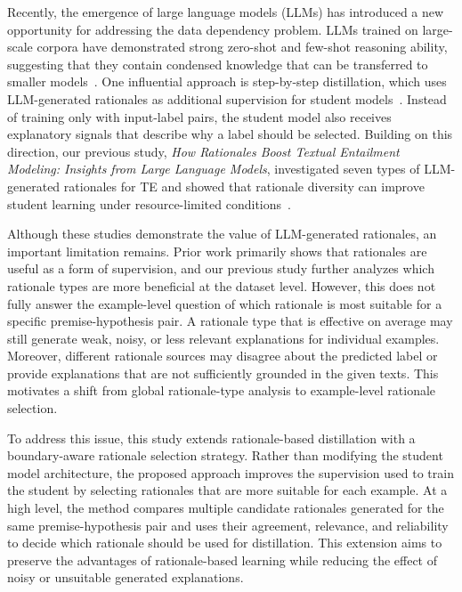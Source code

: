 \documentclass[11pt]{article}
\begin{document}
Recently, the emergence of large language models (LLMs) has introduced a new opportunity for addressing the data dependency problem. LLMs trained on large-scale corpora have demonstrated strong zero-shot and few-shot reasoning ability, suggesting that they contain condensed knowledge that can be transferred to smaller models~\cite{brown2020language,wei2022chain}. One influential approach is step-by-step distillation, which uses LLM-generated rationales as additional supervision for student models~\cite{hsieh2023distilling}. Instead of training only with input-label pairs, the student model also receives explanatory signals that describe why a label should be selected. Building on this direction, our previous study, \emph{How Rationales Boost Textual Entailment Modeling: Insights from Large Language Models}, investigated seven types of LLM-generated rationales for TE and showed that rationale diversity can improve student learning under resource-limited conditions~\cite{our_rationale_te_paper}.

Although these studies demonstrate the value of LLM-generated rationales, an important limitation remains. Prior work primarily shows that rationales are useful as a form of supervision, and our previous study further analyzes which rationale types are more beneficial at the dataset level. However, this does not fully answer the example-level question of which rationale is most suitable for a specific premise-hypothesis pair. A rationale type that is effective on average may still generate weak, noisy, or less relevant explanations for individual examples. Moreover, different rationale sources may disagree about the predicted label or provide explanations that are not sufficiently grounded in the given texts. This motivates a shift from global rationale-type analysis to example-level rationale selection.

To address this issue, this study extends rationale-based distillation with a boundary-aware rationale selection strategy. Rather than modifying the student model architecture, the proposed approach improves the supervision used to train the student by selecting rationales that are more suitable for each example. At a high level, the method compares multiple candidate rationales generated for the same premise-hypothesis pair and uses their agreement, relevance, and reliability to decide which rationale should be used for distillation. This extension aims to preserve the advantages of rationale-based learning while reducing the effect of noisy or unsuitable generated explanations.
\end{document}
